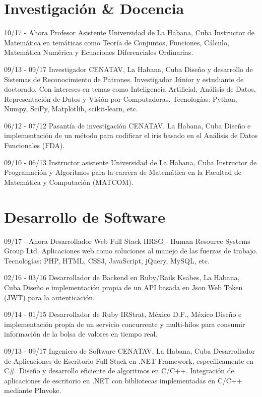 \documentclass[]{friggeri-cv}
\begin{document}
\section{Investigación \& Docencia}
\begin{entrylist}
  \entry
    {10/17 - Ahora}
    {Profesor Asistente}
    {Universidad de La Habana, Cuba}
    {Instructor de Matemática en temáticas como Teoría de Conjuntos, Funciones, Cálculo, Matemática Numérica y Ecuaciones Diferenciales Ordinarias.\\}
  
  \entry
    {09/13 - 09/17}
    {Investigador}
    {CENATAV, La Habana, Cuba}
    {Diseño y desarrollo de Sistemas de Reconocimiento de Patrones. Investigador Júnior y estudiante de doctorado. Con intereses en temas como Inteligencia Artificial, Análisis de Datos, Representación de Datos y Visión por Computadoras. Tecnologías: Python, Numpy, SciPy, Matplotlib, scikit-learn, etc.\\}
    
  \entry
    {06/12 - 07/12}
    {Pasantía de investigación}
    {CENATAV, La Habana, Cuba}
    {Diseño e implementación de un método para codificar el iris basado en el Análisis de Datos Funcionales (FDA).\\}
    
  \entry
    {09/10 - 06/13}
    {Instructor asistente}
    {Universidad de La Habana, Cuba}
    {Instructor  de Programación y Algoritmos para la carrera de Matemática en la Facultad de Matemática y Computación (MATCOM).\\}
\end{entrylist}

\section{Desarrollo de Software}
\begin{entrylist}
  \entry
    {09/17 - Ahora}
    {Desarrollador Web Full Stack}
    {HRSG - Human Resource Systems Group Ltd.}
    {Aplicaciones web como soluciones al manejo de las fuerzas de trabajo. Tecnologías: PHP, HTML, CSS3, JavaScript, jQuery, MySQL, etc.\\} 
  
  \entry
    {02/16 - 03/16}
    {Desarrollador de Backend en Ruby/Rails}
    {Ksabes, La Habana, Cuba}
    {Diseño e implementación propia de un API basada en Json Web Token (JWT) para la autenticación.\\}
  
  \entry
    {09/14 - 01/15}
    {Desarrollador de Ruby}
    {IRStrat, México D.F., México}
    {Diseño e implementación propia de un servicio concurrente y multi-hilos para consumir información de la bolsa de valores en tiempo real.\\}

  \entry
    {09/13 - 09/17}
    {Ingeniero de Software}
    {CENATAV, La Habana, Cuba}
    {Desarrollador de Aplicaciones de Escritorio Full Stack en .NET Framework, específicamente en C\#. Diseño y desarrollo eficiente de algoritmos en C/C++. Integración de aplicaciones de escritorio en .NET con bibliotecas implementadas en C/C++ mediante PInvoke.\\}
\end{entrylist}
\end{document}

